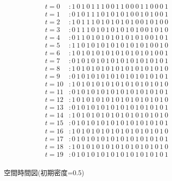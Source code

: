 \documentclass{jsarticle}
\begin{document}
\begin{figure}[htbp]
  \begin{align*}
    t = 0  & : 1 ~ 0 ~ 1 ~ 0 ~ 1 ~ 1 ~ 1 ~ 0 ~ 0 ~ 1 ~ 1 ~ 0 ~ 0 ~ 0 ~ 1 ~ 1 ~ 0 ~ 0 ~ 0 ~ 1 \\
    t = 1  & : 0 ~ 1 ~ 0 ~ 1 ~ 1 ~ 1 ~ 0 ~ 1 ~ 0 ~ 1 ~ 0 ~ 1 ~ 0 ~ 0 ~ 1 ~ 0 ~ 1 ~ 0 ~ 0 ~ 1 \\
    t = 2  & : 1 ~ 0 ~ 1 ~ 1 ~ 1 ~ 0 ~ 1 ~ 0 ~ 1 ~ 0 ~ 1 ~ 0 ~ 1 ~ 0 ~ 0 ~ 1 ~ 0 ~ 1 ~ 0 ~ 0 \\
    t = 3  & : 0 ~ 1 ~ 1 ~ 1 ~ 0 ~ 1 ~ 0 ~ 1 ~ 0 ~ 1 ~ 0 ~ 1 ~ 0 ~ 1 ~ 0 ~ 0 ~ 1 ~ 0 ~ 1 ~ 0 \\
    t = 4  & : 0 ~ 1 ~ 1 ~ 0 ~ 1 ~ 0 ~ 1 ~ 0 ~ 1 ~ 0 ~ 1 ~ 0 ~ 1 ~ 0 ~ 1 ~ 0 ~ 0 ~ 1 ~ 0 ~ 1 \\
    t = 5  & : 1 ~ 1 ~ 0 ~ 1 ~ 0 ~ 1 ~ 0 ~ 1 ~ 0 ~ 1 ~ 0 ~ 1 ~ 0 ~ 1 ~ 0 ~ 1 ~ 0 ~ 0 ~ 1 ~ 0 \\
    t = 6  & : 1 ~ 0 ~ 1 ~ 0 ~ 1 ~ 0 ~ 1 ~ 0 ~ 1 ~ 0 ~ 1 ~ 0 ~ 1 ~ 0 ~ 1 ~ 0 ~ 1 ~ 0 ~ 0 ~ 1 \\
    t = 7  & : 0 ~ 1 ~ 0 ~ 1 ~ 0 ~ 1 ~ 0 ~ 1 ~ 0 ~ 1 ~ 0 ~ 1 ~ 0 ~ 1 ~ 0 ~ 1 ~ 0 ~ 1 ~ 0 ~ 1 \\
    t = 8  & : 1 ~ 0 ~ 1 ~ 0 ~ 1 ~ 0 ~ 1 ~ 0 ~ 1 ~ 0 ~ 1 ~ 0 ~ 1 ~ 0 ~ 1 ~ 0 ~ 1 ~ 0 ~ 1 ~ 0 \\
    t = 9  & : 0 ~ 1 ~ 0 ~ 1 ~ 0 ~ 1 ~ 0 ~ 1 ~ 0 ~ 1 ~ 0 ~ 1 ~ 0 ~ 1 ~ 0 ~ 1 ~ 0 ~ 1 ~ 0 ~ 1 \\
    t = 10 & : 1 ~ 0 ~ 1 ~ 0 ~ 1 ~ 0 ~ 1 ~ 0 ~ 1 ~ 0 ~ 1 ~ 0 ~ 1 ~ 0 ~ 1 ~ 0 ~ 1 ~ 0 ~ 1 ~ 0 \\
    t = 11 & : 0 ~ 1 ~ 0 ~ 1 ~ 0 ~ 1 ~ 0 ~ 1 ~ 0 ~ 1 ~ 0 ~ 1 ~ 0 ~ 1 ~ 0 ~ 1 ~ 0 ~ 1 ~ 0 ~ 1 \\
    t = 12 & : 1 ~ 0 ~ 1 ~ 0 ~ 1 ~ 0 ~ 1 ~ 0 ~ 1 ~ 0 ~ 1 ~ 0 ~ 1 ~ 0 ~ 1 ~ 0 ~ 1 ~ 0 ~ 1 ~ 0 \\
    t = 13 & : 0 ~ 1 ~ 0 ~ 1 ~ 0 ~ 1 ~ 0 ~ 1 ~ 0 ~ 1 ~ 0 ~ 1 ~ 0 ~ 1 ~ 0 ~ 1 ~ 0 ~ 1 ~ 0 ~ 1 \\
    t = 14 & : 1 ~ 0 ~ 1 ~ 0 ~ 1 ~ 0 ~ 1 ~ 0 ~ 1 ~ 0 ~ 1 ~ 0 ~ 1 ~ 0 ~ 1 ~ 0 ~ 1 ~ 0 ~ 1 ~ 0 \\
    t = 15 & : 0 ~ 1 ~ 0 ~ 1 ~ 0 ~ 1 ~ 0 ~ 1 ~ 0 ~ 1 ~ 0 ~ 1 ~ 0 ~ 1 ~ 0 ~ 1 ~ 0 ~ 1 ~ 0 ~ 1 \\
    t = 16 & : 1 ~ 0 ~ 1 ~ 0 ~ 1 ~ 0 ~ 1 ~ 0 ~ 1 ~ 0 ~ 1 ~ 0 ~ 1 ~ 0 ~ 1 ~ 0 ~ 1 ~ 0 ~ 1 ~ 0 \\
    t = 17 & : 0 ~ 1 ~ 0 ~ 1 ~ 0 ~ 1 ~ 0 ~ 1 ~ 0 ~ 1 ~ 0 ~ 1 ~ 0 ~ 1 ~ 0 ~ 1 ~ 0 ~ 1 ~ 0 ~ 1 \\
    t = 18 & : 1 ~ 0 ~ 1 ~ 0 ~ 1 ~ 0 ~ 1 ~ 0 ~ 1 ~ 0 ~ 1 ~ 0 ~ 1 ~ 0 ~ 1 ~ 0 ~ 1 ~ 0 ~ 1 ~ 0 \\
    t = 19 & : 0 ~ 1 ~ 0 ~ 1 ~ 0 ~ 1 ~ 0 ~ 1 ~ 0 ~ 1 ~ 0 ~ 1 ~ 0 ~ 1 ~ 0 ~ 1 ~ 0 ~ 1 ~ 0 ~ 1 \\
  \end{align*}
  \caption{空間時間図(初期密度=0.5)}
  \label{fig:output2}
\end{figure}
\end{document}
